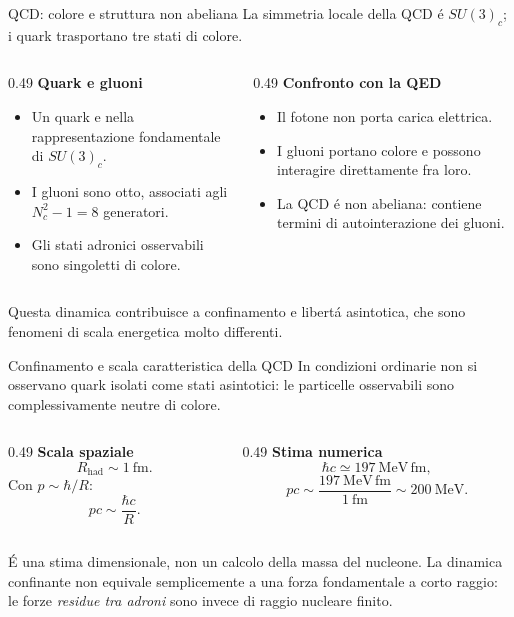 \begin{frame}{QCD: colore e struttura non abeliana}
\small
La simmetria locale della QCD \'e $SU(3)_c$;
i quark trasportano tre stati di colore.
\begin{columns}[T,onlytextwidth]
\begin{column}{0.49\textwidth}
\textbf{Quark e gluoni}
\begin{itemize}
\item Un quark e nella rappresentazione fondamentale
      di $SU(3)_c$.
\item I gluoni sono otto, associati agli
      $N_c^2-1=8$ generatori.
\item Gli stati adronici osservabili sono singoletti di colore.
\end{itemize}
\end{column}
\begin{column}{0.49\textwidth}
\textbf{Confronto con la QED}
\begin{itemize}
\item Il fotone non porta carica elettrica.
\item I gluoni portano colore e possono
      interagire direttamente fra loro.
\item La QCD \'e non abeliana: contiene
      termini di autointerazione dei gluoni.
\end{itemize}
\end{column}
\end{columns}
\medskip
Questa dinamica contribuisce a confinamento e libert\'a asintotica,
che sono fenomeni di scala energetica molto differenti.
\end{frame}

\begin{frame}{Confinamento e scala caratteristica della QCD}
\small
In condizioni ordinarie non si osservano quark isolati come stati
asintotici: le particelle osservabili sono complessivamente neutre di colore.
\begin{columns}[T,onlytextwidth]
\begin{column}{0.49\textwidth}
\textbf{Scala spaziale}
\[
R_{\mathrm{had}}\sim1\ \mathrm{fm}.
\]
Con $p\sim\hbar/R$:
\[
pc\sim\frac{\hbar c}{R}.
\]
\end{column}
\begin{column}{0.49\textwidth}
\textbf{Stima numerica}
\[
\hbar c\simeq197\ \mathrm{MeV\,fm},
\]
\[
pc\sim\frac{197\ \mathrm{MeV\,fm}}{1\ \mathrm{fm}}
\sim200\ \mathrm{MeV}.
\]
\end{column}
\end{columns}
\medskip
\'E una stima dimensionale, non un calcolo della massa del nucleone.
La dinamica confinante non equivale semplicemente a una forza
fondamentale a corto raggio: le forze \emph{residue tra adroni}
sono invece di raggio nucleare finito.
\end{frame}

